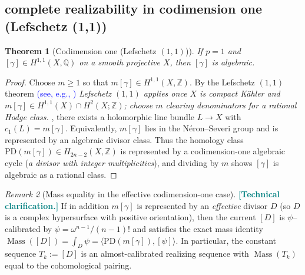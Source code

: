 \documentclass[11pt]{article}
\newcommand{\REV}[1]{\textcolor{blue}{#1}}
\newcommand{\REVMZ}[1]{\textcolor{teal}{#1}}  %
\numberwithin{equation}{section}  %
\theoremstyle{plain}
\newtheorem{theorem}{Theorem}[section]
\theoremstyle{definition}
\theoremstyle{remark}
\newtheorem{remark}[theorem]{Remark}
\newcommand{\Z}{\mathbb{Z}}
\newcommand{\Q}{\mathbb{Q}}
\DeclareMathOperator{\Mass}{Mass}
\begin{document}
\subsection*{complete realizability in codimension one (Lefschetz (1,1))}


\begin{theorem}[Codimension one (Lefschetz $(1,1)$)]\label{thm:codim1}
\label{thm:lefschetz11}
	If $p=1$ and $[\gamma]\in H^{1,1}(X,\Q)$ on a smooth projective $X$, then
	$[\gamma]$ is algebraic.
\end{theorem}

\begin{proof}
Choose $m\ge 1$ so that $m[\gamma]\in H^{1,1}(X,\Z)$.
By the Lefschetz $(1,1)$ theorem \REV{(see, e.g., \cite{Voisin02,GH78,Wells})}
\emph{Lefschetz $(1,1)$ applies once $X$ is compact K\"ahler and $m[\gamma]\in H^{1,1}(X)\cap H^2(X;\Z)$; choose $m$ clearing denominators for a rational Hodge class.}
, there exists a holomorphic line bundle $L\to X$ with
\(
c_1(L)=m[\gamma].
\)
Equivalently, $m[\gamma]$ lies in the N\'eron--Severi group and is represented by an algebraic divisor class.
Thus the homology class $\mathrm{PD}(m[\gamma])\in H_{2n-2}(X,\Z)$ is represented by a codimension-one algebraic cycle
(\emph{a divisor with integer multiplicities}), and dividing by $m$ shows $[\gamma]$ is algebraic as a rational class.
\end{proof}


\begin{remark}[Mass equality in the effective codimension-one case]
\REVMZ{\textbf{[Technical clarification.]}}
If in addition $m[\gamma]$ is represented by an \emph{effective} divisor $D$ (so $D$ is a complex hypersurface with positive orientation),
then the current $[D]$ is $\psi$--calibrated by $\psi=\omega^{n-1}/(n-1)!$ and satisfies the exact mass identity
\(
\Mass([D])=\int_D\psi=\langle \mathrm{PD}(m[\gamma]),[\psi]\rangle.
\)
In particular, the constant sequence $T_k:=[D]$ is an almost-calibrated realizing sequence with $\Mass(T_k)$ equal to the cohomological pairing.
\end{remark}
\end{document}
